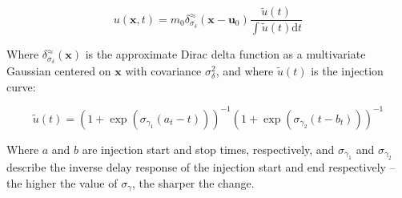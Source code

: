 \documentclass[11pt]{article}
\begin{document}
\[
u(\mathbf{x},t) = m_0\delta^\approx_{\sigma_\delta}(\mathbf{x}-\mathbf{u}_0)\frac{\tilde{u}(t)}{\int \tilde{u}(t)\mathrm{d}t}
\]

Where \(\delta^\approx_{\sigma_\delta}(\mathbf{x})\) is the approximate
Dirac delta function as a multivariate Gaussian centered on
\(\mathbf{x}\) with covariance \(\sigma^2_\delta\), and where
\(\tilde{u}(t)\) is the injection curve:

\[
\tilde{u}(t) = \left(1 + \exp\left(\sigma_{\gamma_1}(a_t - t)\right)\right)^{-1}\left(1 + \exp\left(\sigma_{\gamma_2}(t - b_t)\right)\right)^{-1}
\]

Where \(a\) and \(b\) are injection start and stop times, respectively,
and \(\sigma_{\gamma_1}\) and \(\sigma_{\gamma_2}\) describe the inverse
delay response of the injection start and end respectively -- the higher
the value of \(\sigma_\gamma\), the sharper the change.
\end{document}
